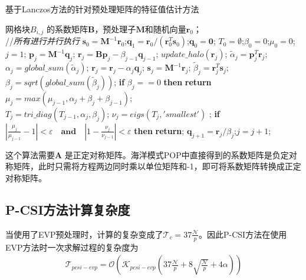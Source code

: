 \begin{algorithm}[!ht]
\caption{基于Lanczos方法的针对预处理矩阵的特征值估计方法}
\label{alg:lanczos_pre}
\begin{algorithmic}[1]
\REQUIRE 网格块$B_{i,j}$ 的系数矩阵$\textbf{B}$，预处理子$\textbf{M}$和随机向量$\textbf{r}_0$； \\
 //\qquad    \textit{所有进行并行执行}
\STATE $\textbf{s}_0=\textbf{M}^{-1}\textbf{r}_0$;\quad $\textbf{q}_1 = \textbf{r}_0/({\textbf{r}_0^T\textbf{s}_0})$;\quad $\textbf{q}_0=\textbf{0}$;
\STATE $T_0=\emptyset$;\quad $\beta_0 =0$;\quad  $\mu_0 =0$;\quad $j=1$;
\STATE $\textbf{p}_j = \textbf{M}^{-1}\textbf{q}_j$; \quad $\textbf{r}_j=\textbf{B}\textbf{p}_j-\beta_{j-1}\textbf{q}_{j-1}$;
\STATE $update\_halo(\textbf{r}_j)$;
\STATE $\tilde{\alpha}_j =\textbf{p}_j^T\textbf{r}_j$; \quad $\alpha_j=global\_sum(\tilde{\alpha}_j)$;
\STATE $\textbf{r}_j=\textbf{r}_j-\alpha_{j}\textbf{q}_{j}$; \quad $\textbf{s}_j = \textbf{M}^{-1}\textbf{r}_j$;
\STATE $\tilde{\beta}_j = \textbf{r}_j^T\textbf{s}_j$; \quad $\beta_j=sqrt(global\_sum(\tilde{\beta}_j))$;
\STATE \textbf{if} $\beta_j == 0$ \textbf{then} \textbf{return}
\STATE $\mu_j = max(\mu_{j-1},\alpha_j+\beta_j+\beta_{j-1})$; \label{lan_gersh}\\
\STATE $T_j=tri\_diag(T_{j-1},\alpha_j,\beta_j)$; \label{lan_tm}
\STATE $\nu_j = eigs(T_j,'smallest')$ ; \label{lan_nu}
\STATE \textbf{if} $|\frac{\mu_j}{\mu_{j-1}} -1 |< \varepsilon\quad\textbf{and}\quad|1- \frac{\nu_j}{\nu_{j-1}}|< \varepsilon$ \textbf{then} \textbf{return}; \label{lanczos_converge}
\STATE $\textbf{q}_{j+1}= \textbf{r}_j/\beta_j$;\quad $j=j+1$;
\ENDWHILE
\end{algorithmic}
\end{algorithm}

这个算法需要$\textbf{A}$ 是正定对称矩阵。海洋模式POP中直接得到的系数矩阵是负定对称矩阵，此时只需将方程两边同时乘以单位矩阵和-1，即可将系数矩阵转换成正定对称矩阵。 

\subsection{P-CSI方法计算复杂度}  \label{precond:PCSI:complex}

当使用了EVP预处理时，计算的复杂变成了$\mathcal{T}_c = 37 \frac{\mathcal{N}}{p}$。因此P-CSI方法在使用EVP方法时一次求解过程的复杂度为
\begin{eqnarray}
\label{t_pcsiEvp}
\mathcal{T}_{pcsi-evp}=\mathcal{O}(\mathcal{K}_{pcsi-evp} (37\frac{\mathcal{N}}{p} +8\sqrt{\frac{\mathcal{N} }{p}} + 4\alpha))
\end{eqnarray}

